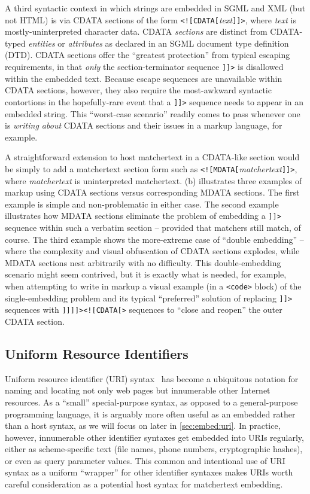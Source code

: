 A third syntactic context in which strings are embedded in SGML and XML
(but not HTML)
is via CDATA sections of the form \verb|<![CDATA[|\emph{text}\verb|]]>|,
where \emph{text} is mostly-uninterpreted character data.
CDATA \emph{sections} are distinct from
CDATA-typed \emph{entities} or \emph{attributes}
as declared in an SGML document type definition (DTD).
CDATA sections offer the ``greatest protection''
from typical \ml escaping requirements,
in that \emph{only} the section-terminator sequence \verb|]]>|
is disallowed within the embedded text.
Because \ml escape sequences are unavailable within CDATA sections, however,
they also require the most-awkward syntactic contortions
in the hopefully-rare event that a \verb|]]>| sequence
needs to appear in an embedded string.
This ``worst-case scenario'' readily comes to pass
whenever one is \emph{writing about} CDATA sections and their issues
in a \ml markup language, for example.

A straightforward extension to host matchertext in a CDATA-like section
would be simply to add a matchertext section form
such as \verb|<![MDATA[|\emph{matchertext}\verb|]]>|,
where \emph{matchertext} is uninterpreted matchertext.
(b) illustrates three examples of markup
using CDATA sections versus corresponding MDATA sections.
The first example is simple and non-problematic in either case.
The second example illustrates how MDATA sections eliminate the problem
of embedding a \verb|]]>| sequence within such a verbatim section --
provided that matchers still match, of course.
The third example shows the more-extreme case of ``double embedding'' --
where the complexity and visual obfuscation of CDATA sections explodes,
while MDATA sections nest arbitrarily with no difficulty.
This double-embedding scenario might seem contrived,
but it is exactly what is needed, for example,
when attempting to write in \ml markup a visual example
(\eg in a \verb|<code>| block)
of the single-embedding problem and its typical ``preferred'' solution
of replacing \verb|]]>| sequences with \verb|]]]]><![CDATA[>| sequences
to ``close and reopen'' the outer CDATA section.


\subsection{Uniform Resource Identifiers}
\label{sec:host:uri}

Uniform resource identifier (URI) syntax~\cite{rfc3986}
has become a ubiquitous notation for naming and locating
not only web pages but innumerable other Internet resources.
As a ``small'' special-purpose syntax,
as opposed to a general-purpose programming language,
it is arguably more often useful as an embedded rather than a host syntax,
as we will focus on later in \cref{sec:embed:uri}.
In practice, however, innumerable other identifier syntaxes
get embedded into URIs regularly,
either as scheme-specific text
(\eg file names, phone numbers, cryptographic hashes),
or even as query parameter values.
This common and intentional use of URI syntax
as a uniform ``wrapper'' for other identifier syntaxes
makes URIs worth careful consideration as a potential host syntax
for matchertext embedding.

